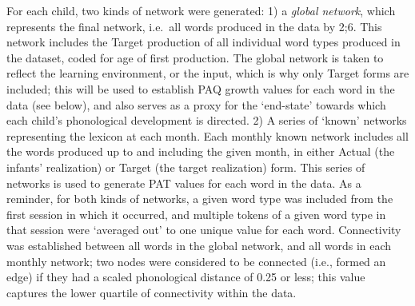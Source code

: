 \documentclass[
  man]{apa6}
\begin{document}
For each child, two kinds of network were generated: 1) a \emph{global network}, which represents the final network, i.e.~all words produced in the data by 2;6. This network includes the Target production of all individual word types produced in the dataset, coded for age of first production. The global network is taken to reflect the learning environment, or the input, which is why only Target forms are included; this will be used to establish PAQ growth values for each word in the data (see below), and also serves as a proxy for the `end-state' towards which each child's phonological development is directed. 2) A series of `known' networks representing the lexicon at each month. Each monthly known network includes all the words produced up to and including the given month, in either Actual (the infants' realization) or Target (the target realization) form. This series of networks is used to generate PAT values for each word in the data. As a reminder, for both kinds of networks, a given word type was included from the first session in which it occurred, and multiple tokens of a given word type in that session were `averaged out' to one unique value for each word. Connectivity was established between all words in the global network, and all words in each monthly network; two nodes were considered to be connected (i.e., formed an edge) if they had a scaled phonological distance of 0.25 or less; this value captures the lower quartile of connectivity within the data.
\end{document}
